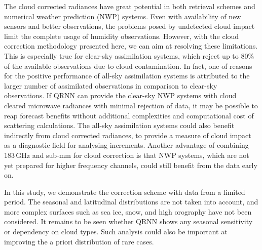 \documentclass[amt, manuscript]{copernicus}
\begin{document}
The cloud corrected radiances have great potential in both retrieval schemes and numerical weather prediction (NWP) systems. Even with availability of new sensors and better observations, the problems posed by undetected cloud impact limit the complete usage of humidity observations. However, with the cloud correction methodology presented here, we can aim at resolving these limitations. This is especially true for clear-sky assimilation systems, which reject up to 80\% of the available observations due to cloud contamination. In fact, one of reasons for the positive performance of all-sky assimilation systems is attributed to the larger number of assimilated observations in comparison to clear-sky observations. If QRNN can provide the clear-sky NWP systems with cloud cleared microwave radiances with minimal rejection of data, it may be possible to reap forecast benefits without additional complexities and computational cost of scattering calculations. The all-sky assimilation systems could also benefit indirectly from cloud corrected radiances, to provide a measure of cloud impact as a diagnostic field for analysing increments. Another advantage of combining 183\,GHz and sub-mm for cloud correction is that NWP systems, which are not yet prepared for higher frequency channels, could still benefit from the data early on. 

In this study, we demonstrate the correction scheme with data from a limited period. The seasonal and latitudinal distributions are not taken into account, and more complex surfaces such as sea ice, snow, and high orography have not been considered. It remains to be seen whether QRNN shows any seasonal sensitivity or dependency on cloud types. Such analysis could also be important at improving the a priori distribution of rare cases. 




\appendix
\end{document}
